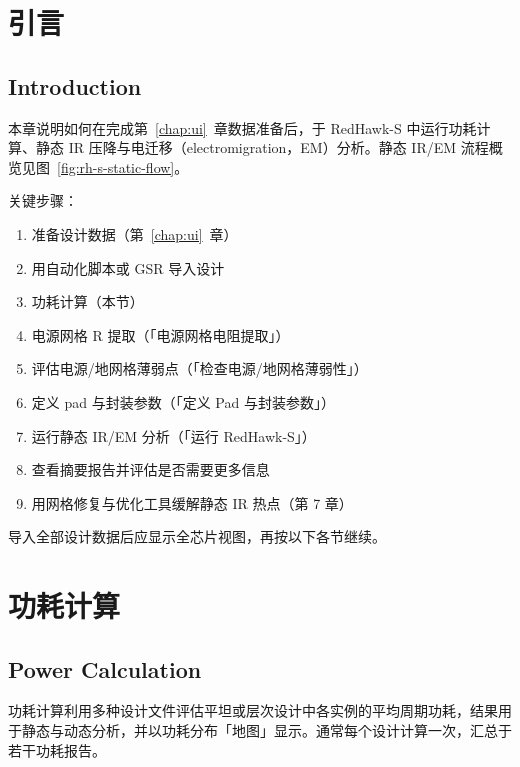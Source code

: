 ﻿%
\label{chap:static}

\section{引言}
\subsection*{Introduction}

本章说明如何在完成第~\ref{chap:ui}~章数据准备后，于 RedHawk-S 中运行功耗计算、静态 IR 压降与电迁移（electromigration，EM）分析。静态 IR/EM 流程概览见图~\ref{fig:rh-s-static-flow}。

\label{fig:rh-s-static-flow}

关键步骤：
\begin{enumerate}
  \item 准备设计数据（第~\ref{chap:ui}~章）
  \item 用自动化脚本或 GSR 导入设计
  \item 功耗计算（本节）
  \item 电源网格 R 提取（「电源网格电阻提取」）
  \item 评估电源/地网格薄弱点（「检查电源/地网格薄弱性」）
  \item 定义 pad 与封装参数（「定义 Pad 与封装参数」）
  \item 运行静态 IR/EM 分析（「运行 RedHawk-S」）
  \item 查看摘要报告并评估是否需要更多信息
  \item 用网格修复与优化工具缓解静态 IR 热点（第 7 章）
\end{enumerate}

导入全部设计数据后应显示全芯片视图，再按以下各节继续。

\section{功耗计算}
\subsection*{Power Calculation}

功耗计算利用多种设计文件评估平坦或层次设计中各实例的平均周期功耗，结果用于静态与动态分析，并以功耗分布「地图」显示。通常每个设计计算一次，汇总于若干功耗报告。

